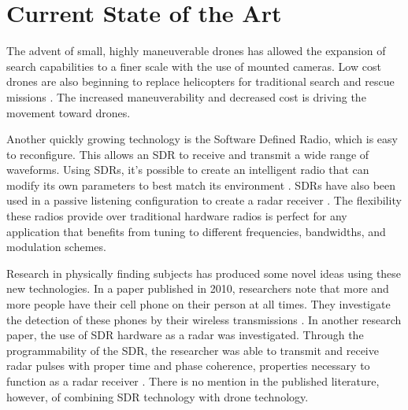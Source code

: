 \section{Current State of the Art}
The advent of small, highly maneuverable drones has allowed the expansion of search capabilities to a finer scale with the use of mounted cameras. Low cost drones are also beginning to replace helicopters for traditional search and rescue missions \cite{drone_replacement}. The increased maneuverability and decreased cost is driving the movement toward drones.\par
Another quickly growing technology is the Software Defined Radio, which is easy to reconfigure. This allows an SDR to receive and transmit a wide range of waveforms. Using SDRs, it’s possible to create an intelligent radio that can modify its own parameters to best match its environment \cite{int_radio}. SDRs have also been used in a passive listening configuration to create a radar receiver \cite{radar_conf}. The flexibility these radios provide over traditional hardware radios is perfect for any application that benefits from tuning to different frequencies, bandwidths, and modulation schemes.\par
Research in physically finding subjects has produced some novel ideas using these new technologies. In a paper published in 2010, researchers note that more and more people have their cell phone on their person at all times. They investigate the detection of these phones by their wireless transmissions \cite{novel_localization}. In another research paper, the use of SDR hardware as a radar was investigated. Through the programmability of the SDR, the researcher was able to transmit and receive radar pulses with proper time and phase coherence, properties necessary to function as a radar receiver \cite{GNR_sdr}. There is no mention in the published literature, however, of combining SDR technology with drone technology.\par
